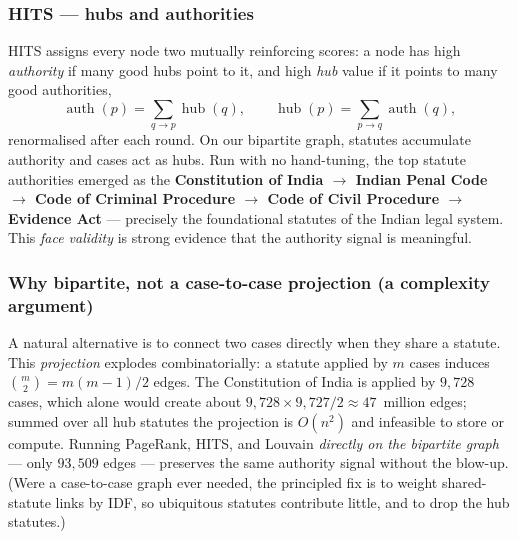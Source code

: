 \subsubsection{HITS --- hubs and authorities}
HITS assigns every node two mutually reinforcing scores: a node has high \emph{authority} if
many good hubs point to it, and high \emph{hub} value if it points to many good authorities,
\begin{equation}
\operatorname{auth}(p) = \sum_{q \to p} \operatorname{hub}(q),
\qquad
\operatorname{hub}(p) = \sum_{p \to q} \operatorname{auth}(q),
\end{equation}
renormalised after each round. On our bipartite graph, statutes accumulate authority and cases
act as hubs. Run with no hand-tuning, the top statute authorities emerged as the
\textbf{Constitution of India $\rightarrow$ Indian Penal Code $\rightarrow$ Code of Criminal
Procedure $\rightarrow$ Code of Civil Procedure $\rightarrow$ Evidence Act} --- precisely the
foundational statutes of the Indian legal system. This \emph{face validity} is strong evidence
that the authority signal is meaningful.

\subsubsection{Why bipartite, not a case-to-case projection (a complexity argument)}
A natural alternative is to connect two cases directly when they share a statute. This
\emph{projection} explodes combinatorially: a statute applied by $m$ cases induces
$\binom{m}{2} = m(m-1)/2$ edges. The Constitution of India is applied by $9{,}728$ cases, which
alone would create about $9{,}728 \times 9{,}727 / 2 \approx 47$~million edges; summed over all
hub statutes the projection is $O(n^2)$ and infeasible to store or compute. Running PageRank,
HITS, and Louvain \emph{directly on the bipartite graph} --- only $93{,}509$ edges --- preserves
the same authority signal without the blow-up. (Were a case-to-case graph ever needed, the
principled fix is to weight shared-statute links by IDF, so ubiquitous statutes contribute
little, and to drop the hub statutes.)


